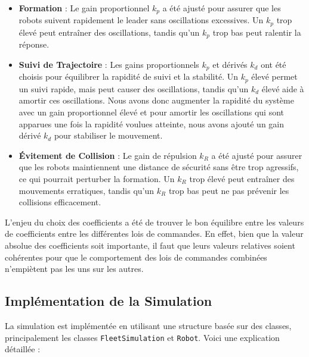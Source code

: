\documentclass[a4paper,12pt]{article}
\begin{document}
\begin{itemize}
    \item \textbf{Formation} : Le gain proportionnel \( k_p \) a été ajusté pour assurer que les robots suivent rapidement le leader sans oscillations excessives. Un \( k_p \) trop élevé peut entraîner des oscillations, tandis qu'un \( k_p \) trop bas peut ralentir la réponse.
    \item \textbf{Suivi de Trajectoire} : Les gains proportionnels \( k_p \) et dérivés \( k_d \) ont été choisis pour équilibrer la rapidité de suivi et la stabilité. Un \( k_p \) élevé permet un suivi rapide, mais peut causer des oscillations, tandis qu'un \( k_d \) élevé aide à amortir ces oscillations. Nous avons donc augmenter la rapidité du système avec un gain proportionnel élevé et pour amortir les oscillations qui sont apparues une fois la rapidité voulues atteinte, nous avons ajouté un gain dérivé \( k_d \) pour stabiliser le mouvement.
    \item \textbf{Évitement de Collision} : Le gain de répulsion \( k_R \) a été ajusté pour assurer que les robots maintiennent une distance de sécurité sans être trop agressifs, ce qui pourrait perturber la formation. Un \( k_R \) trop élevé peut entraîner des mouvements erratiques, tandis qu'un \( k_R \) trop bas peut ne pas prévenir les collisions efficacement.
\end{itemize}

L'enjeu du choix des coefficients a été de trouver le bon équilibre entre les valeurs de coefficients entre les différentes lois de commandes. En effet, bien que la valeur absolue des coefficients soit importante, il faut que leurs valeurs relatives soient cohérentes pour que le comportement des lois de commandes combinées n'empiètent pas les uns sur les autres.

\subsection*{Implémentation de la Simulation}
La simulation est implémentée en utilisant une structure basée sur des classes, principalement les classes \texttt{FleetSimulation} et \texttt{Robot}. Voici une explication détaillée :
\end{document}
